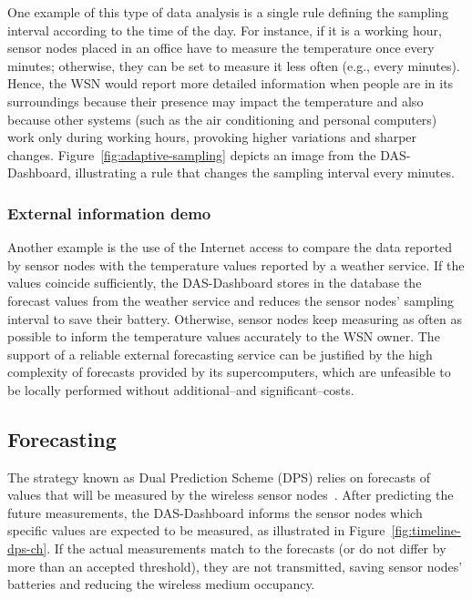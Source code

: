 \documentclass[conference, letterpaper]{IEEEtran}
\newcommand{\dashboard}[1]{DAS-Dashboard}
\begin{document}
One example of this type of data analysis is a single rule defining the sampling interval according to the time of the day. For instance, if it is a working hour, sensor nodes placed in an office have to measure the temperature once every  minutes; otherwise, they can be set to measure it less often (e.g., every  minutes). Hence, the WSN would report more detailed information when people are in its surroundings because their presence may impact the temperature and also because other systems (such as the air conditioning and personal computers) work only during working hours, provoking higher variations and sharper changes. Figure~\ref{fig:adaptive-sampling} depicts an image from the \dashboard{}, illustrating a rule that changes the sampling interval every  minutes.

\subsubsection{External information demo}

Another example is the use of the Internet access to compare the data reported by sensor nodes with the temperature values reported by a weather service. If the values coincide sufficiently, the \dashboard{} stores in the database the forecast values from the weather service and reduces the sensor nodes' sampling interval to save their battery. Otherwise, sensor nodes keep measuring as often as possible to inform the temperature values accurately to the WSN owner. The support of a reliable external forecasting service can be justified by the high complexity of forecasts provided by its supercomputers, which are unfeasible to be locally performed without additional--and significant--costs.

\subsection{Forecasting}

The strategy known as Dual Prediction Scheme (DPS) relies on forecasts of values that will be measured by the wireless sensor nodes~\cite{Dias2016b}. After predicting the future measurements, the \dashboard{} informs the sensor nodes which specific values are expected to be measured, as illustrated in Figure~\ref{fig:timeline-dps-ch}. If the actual measurements match to the forecasts (or do not differ by more than an accepted threshold), they are not transmitted, saving sensor nodes' batteries and reducing the wireless medium occupancy.
\end{document}
